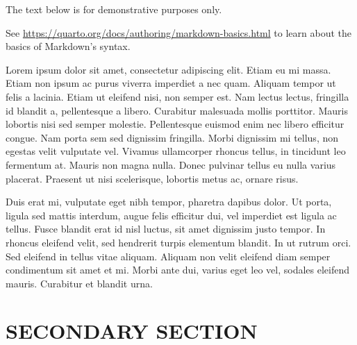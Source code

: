 \documentclass[
  12pt,
  a4paper,
  oneside]{tesesusp}
\begin{document}
\begin{tcolorbox}[enhanced jigsaw, titlerule=0mm, toprule=.15mm, left=2mm, rightrule=.15mm, breakable, title=\textcolor{quarto-callout-important-color}{\faExclamation}\hspace{0.5em}{Important}, bottomrule=.15mm, coltitle=black, leftrule=.75mm, colframe=quarto-callout-important-color-frame, opacitybacktitle=0.6, bottomtitle=1mm, toptitle=1mm, colbacktitle=quarto-callout-important-color!10!white, arc=.35mm, opacityback=0, colback=white]

The text below is for demonstrative purposes only.

\vspace{5pt}

See \url{https://quarto.org/docs/authoring/markdown-basics.html} to
learn about the basics of Markdown's syntax.

\end{tcolorbox}

\vspace{10pt}

Lorem ipsum dolor sit amet, consectetur adipiscing elit. Etiam eu mi
massa. Etiam non ipsum ac purus viverra imperdiet a nec quam. Aliquam
tempor ut felis a lacinia. Etiam ut eleifend nisi, non semper est. Nam
lectus lectus, fringilla id blandit a, pellentesque a libero. Curabitur
malesuada mollis porttitor. Mauris lobortis nisi sed semper molestie.
Pellentesque euismod enim nec libero efficitur congue. Nam porta sem sed
dignissim fringilla. Morbi dignissim mi tellus, non egestas velit
vulputate vel. Vivamus ullamcorper rhoncus tellus, in tincidunt leo
fermentum at. Mauris non magna nulla. Donec pulvinar tellus eu nulla
varius placerat. Praesent ut nisi scelerisque, lobortis metus ac, ornare
risus.

Duis erat mi, vulputate eget nibh tempor, pharetra dapibus dolor. Ut
porta, ligula sed mattis interdum, augue felis efficitur dui, vel
imperdiet est ligula ac tellus. Fusce blandit erat id nisl luctus, sit
amet dignissim justo tempor. In rhoncus eleifend velit, sed hendrerit
turpis elementum blandit. In ut rutrum orci. Sed eleifend in tellus
vitae aliquam. Aliquam non velit eleifend diam semper condimentum sit
amet et mi. Morbi ante dui, varius eget leo vel, sodales eleifend
mauris. Curabitur et blandit urna.

\hypertarget{secondary-section-2}{%
\section{SECONDARY SECTION}\label{secondary-section-2}}
\end{document}
